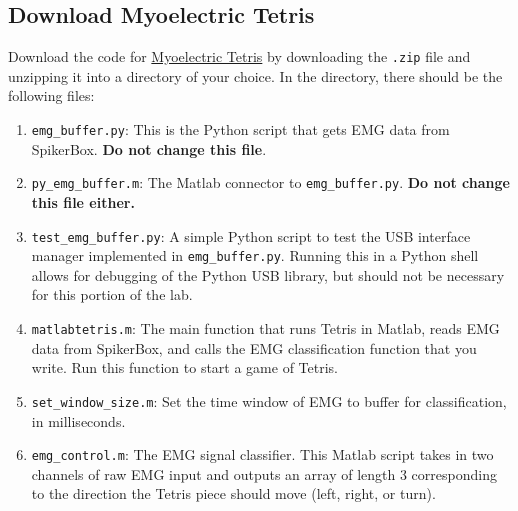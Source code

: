 \documentclass[10pt,oneside,a4paper]{article}
\begin{document}
\subsection{Download Myoelectric Tetris}
Download the code for \href{https://github.com/mfliu/Myoelectric_Tetris} {\color{blue} Myoelectric Tetris} by downloading the \texttt{.zip} file and unzipping it into a directory of your choice. In the directory, there should be the following files: \\
\begin{enumerate}
\item \texttt{emg\_buffer.py}: This is the Python script that gets EMG data from SpikerBox. \textbf{Do not change this file}.
\item \texttt{py\_emg\_buffer.m}: The Matlab connector to \texttt{emg\_buffer.py}. \textbf{Do not change this file either.}
\item \texttt{test\_emg\_buffer.py}: A simple Python script to test the USB interface manager implemented in \texttt{emg\_buffer.py}. Running this in a Python shell allows for debugging of the Python USB library, but should not be necessary for this portion of the lab.
\item \texttt{matlabtetris.m}: The main function that runs Tetris in Matlab, reads EMG data from SpikerBox, and calls the EMG classification function that you write. Run this function to start a game of Tetris.
\item \texttt{set\_window\_size.m}: Set the time window of EMG to buffer for classification, in milliseconds. 
\item \texttt{emg\_control.m}: The EMG signal classifier. This Matlab script takes in two channels of raw EMG input and outputs an array of length 3 corresponding to the direction the Tetris piece should move (left, right, or turn).
\end{enumerate}
\end{document}

